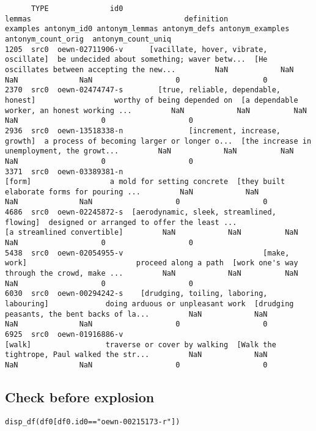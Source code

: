 \documentclass[a4paper,10pt,onecolumn,oneside,openright]{article}
\begin{document}
\begin{verbatim}
      TYPE              id0                                      lemmas                                   definition                                     examples antonym_id0 antonym_lemmas antonym_defs antonym_examples  antonym_count_orig  antonym_count_uniq
1205  src0  oewn-02711906-v      [vacillate, hover, vibrate, oscillate]  be undecided about something; waver betw...  [He oscillates between accepting the new...         NaN            NaN          NaN              NaN                   0                   0
2370  src0  oewn-02474747-s        [true, reliable, dependable, honest]                  worthy of being depended on  [a dependable worker, an honest working ...         NaN            NaN          NaN              NaN                   0                   0
2936  src0  oewn-13518338-n               [increment, increase, growth]  a process of becoming larger or longer o...  [the increase in unemployment, the growt...         NaN            NaN          NaN              NaN                   0                   0
3371  src0  oewn-03389381-n                                      [form]                  a mold for setting concrete  [they built elaborate forms for pouring ...         NaN            NaN          NaN              NaN                   0                   0
4686  src0  oewn-02245872-s  [aerodynamic, sleek, streamlined, flowing]  designed or arranged to offer the least ...                  [a streamlined convertible]         NaN            NaN          NaN              NaN                   0                   0
5438  src0  oewn-02054955-v                                [make, work]                         proceed along a path  [work one's way through the crowd, make ...         NaN            NaN          NaN              NaN                   0                   0
6030  src0  oewn-00294242-s    [drudging, toiling, laboring, labouring]             doing arduous or unpleasant work  [drudging peasants, the bent backs of la...         NaN            NaN          NaN              NaN                   0                   0
6925  src0  oewn-01916886-v                                      [walk]                 traverse or cover by walking  [Walk the tightrope, Paul walked the str...         NaN            NaN          NaN              NaN                   0                   0
\end{verbatim}
\subsection{Check before explosion}
\label{sec:org55c33b3}
\begin{verbatim}
disp_df(df0[df0.id0=="oewn-00215173-r"])
\end{verbatim}
\end{document}
